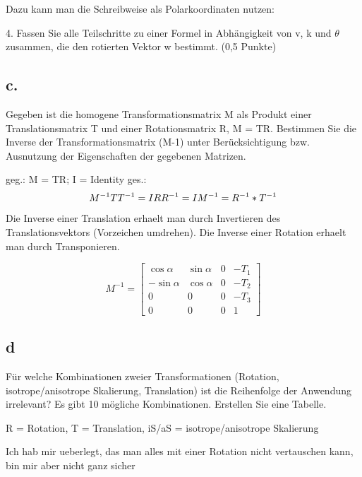 \documentclass[12pt]{scrreprt}
\begin{document}
Dazu kann man die Schreibweise als Polarkoordinaten nutzen:


4. Fassen Sie alle Teilschritte zu einer Formel in Abhängigkeit von v, k und \(\theta\) zusammen, die den
rotierten Vektor w bestimmt. (0,5 Punkte)



\subsection*{c.}

Gegeben ist die homogene Transformationsmatrix M als Produkt einer Translationsmatrix T und einer
Rotationsmatrix R, M = TR. Bestimmen Sie die Inverse der Transformationsmatrix (M-1) unter
Berücksichtigung bzw. Ausnutzung der Eigenschaften der gegebenen Matrizen.

geg.: M = TR; I = Identity
ges.: \[M^{-1} \\
 \\
TT^{-1} = I \\
RR^{-1} = I \\
M^{-1} = R^{-1} * T^{-1}
\]

Die Inverse einer Translation erhaelt man durch Invertieren des Translationsvektors (Vorzeichen umdrehen).
Die Inverse einer Rotation erhaelt man durch Transponieren.

\[
 M^{-1} = \begin{bmatrix}
       \cos \alpha & \sin\alpha & 0 & -T_1 \\[0.3em]
       -\sin\alpha & \cos\alpha & 0 & -T_2 \\[0.3em]
       0           & 0          & 0 & -T_3 \\[0.3em]
       0           & 0          & 0 & 1
     \end{bmatrix}
\]

\subsection*{d}

Für welche Kombinationen zweier Transformationen (Rotation, isotrope/anisotrope Skalierung,
Translation) ist die Reihenfolge der Anwendung irrelevant? Es gibt 10 mögliche Kombinationen. Erstellen
Sie eine Tabelle.


R = Rotation, T = Translation,  iS/aS = isotrope/anisotrope Skalierung

Ich hab mir ueberlegt, das man alles mit einer Rotation nicht vertauschen kann, bin mir aber nicht ganz sicher
\end{document}
